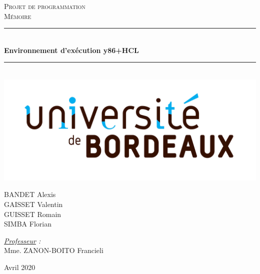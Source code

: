 \documentclass[french]{article}
\newcommand{\HRule}{\rule{\linewidth}{0.5mm}}
\begin{document}
\begin{titlepage}
  \begin{sffamily}
  \begin{center}

    \textsc{\LARGE Projet de programmation}\\[2cm]

    \textsc{\Large Mémoire}\\[1.5cm]

    \HRule \\[0.4cm]
    { \huge \bfseries Environnement d'exécution y86+HCL\\[0.4cm] }

    \HRule \\[1cm]
    \includegraphics[scale=0.07]{img/logoUB.jpg}
    \\[2cm]

    \begin{minipage}{0.4\textwidth}
      \begin{flushleft} \large
        \textsc{BANDET} Alexis\\
        \textsc{GAISSET} Valentin\\
        \textsc{GUISSET} Romain\\
        \textsc{SIMBA} Florian\\
      \end{flushleft}
    \end{minipage}
    \begin{minipage}{0.4\textwidth}
      \begin{flushright} \large
        \emph{\underline{Professeur} :}\\ Mme. \textsc{ZANON-BOITO} Francieli\\
      \end{flushright}
    \end{minipage}

    \vfill

    {\large Avril 2020}

  \end{center}
  \end{sffamily}
\end{titlepage}
\end{document}
